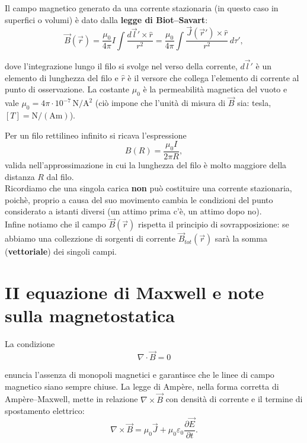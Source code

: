 \documentclass{book}
\begin{document}
Il campo magnetico generato da una corrente stazionaria (in questo caso in superfici o volumi) \`e dato dalla \textbf{legge di Biot--Savart}:
\begin{equation}
\vec{B}(\vec{r}) = \frac{\mu_0}{4\pi}I\int\frac{d\vec l'\times\hat r}{r^2} = \frac{\mu_0}{4\pi}\int\frac{\vec J(\vec r')\times\hat r}{r^2} \,d\tau',
\end{equation}

dove l'integrazione lungo il filo si svolge nel verso della corrente, $d\vec l'$ \`e un elemento di lunghezza del filo e $\hat r$ \`e il versore che collega l'elemento di corrente al punto di osservazione. La costante $\mu_0$ \`e la permeabilit\`a magnetica del vuoto e vale $\mu_0=4\pi\cdot10^{-7}\,\mathrm{N/A^2}$ (ciò impone che l'unit\`a di misura di $\vec{B}$ sia: tesla, $[T]=\mathrm{N/(Am)}$).

Per un filo rettilineo infinito si ricava l'espressione
\begin{equation}
B(R) = \frac{\mu_0 I}{2\pi R},
\end{equation}
valida nell'approssimazione in cui la lunghezza del filo \`e molto maggiore della distanza $R$ dal filo.
\\
Ricordiamo che una singola carica \textbf{non} può costituire una corrente stazionaria, poichè, proprio a causa del suo movimento
cambia le condizioni del punto considerato a istanti diversi (un attimo prima c'è, un attimo dopo no).
\\
Infine notiamo che il campo $\vec{B}(\vec{r})$ rispetta il principio di sovrapposizione: se abbiamo una collezzione di sorgenti di corrente
$\vec{B}_{tot}(\vec{r})$ sarà la somma (\textbf{vettoriale}) dei singoli campi.

\section{II equazione di Maxwell e note sulla magnetostatica}

La condizione
\begin{equation}
\nabla\cdot\vec B=0
\end{equation}

enuncia l'assenza di monopoli magnetici e garantisce che le linee di campo magnetico siano sempre chiuse. La legge di Amp\`ere, nella forma corretta di Amp\`ere--Maxwell, mette in relazione \(\nabla\times\vec B\) con densit\`a di corrente e il termine di spostamento elettrico:
\begin{equation}
\nabla\times\vec B = \mu_0\vec J + \mu_0\varepsilon_0\frac{\partial\vec E}{\partial t}.
\end{equation}
\end{document}
